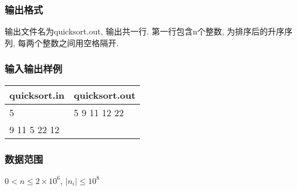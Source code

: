 \subsubsection{输出格式}
输出文件名为quicksort.out, 输出共一行.
第一行包含n个整数, 为排序后的升序序列, 每两个整数之间用空格隔开.
\subsubsection{输入输出样例}
\begin{table}[h!]
	\centering
	\begin{tabular}{|l|l|}
		\hline
		quicksort.in & quicksort.out \\
		\hline
		5            & 5 9 11 12 22  \\
		9 11 5 22 12 & ~             \\
		\hline
	\end{tabular}
\end{table}
\subsubsection{数据范围}
$ 0 < n \leq 2\times 10^6 $,
$ | n_i | \leq 10^8 $
